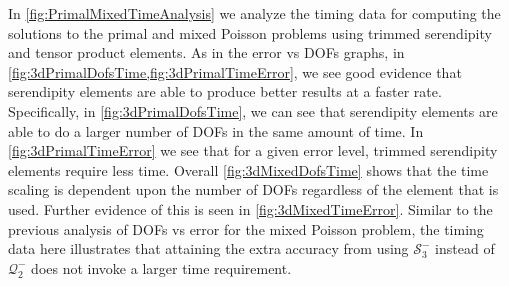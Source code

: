 \documentclass[format=acmsmall,screen,timestamp=false,a4paper]{acmart}
\begin{document}
In \cref{fig:PrimalMixedTimeAnalysis} we analyze the timing data for computing the solutions to the primal and mixed Poisson problems using trimmed serendipity and tensor product elements.  As in the error vs DOFs graphs, in \cref{fig:3dPrimalDofsTime,fig:3dPrimalTimeError}, we see good evidence that serendipity elements are able to produce better results at a faster rate.  Specifically, in \cref{fig:3dPrimalDofsTime}, we can see that serendipity elements are able to do a larger number of DOFs in the same amount of time.  In \cref{fig:3dPrimalTimeError} we see that for a given error level, trimmed serendipity elements require less time.  Overall \cref{fig:3dMixedDofsTime} shows that the time scaling is dependent upon the number of DOFs regardless of the element that is used.  Further evidence of this is seen in \cref{fig:3dMixedTimeError}.  Similar to the previous analysis of DOFs vs error for the mixed Poisson problem, the timing data here illustrates that attaining the extra accuracy from using $\mathcal{S}^-_3$ instead of $\mathcal{Q}^-_2$ does not invoke a larger time requirement.  
\end{document}
